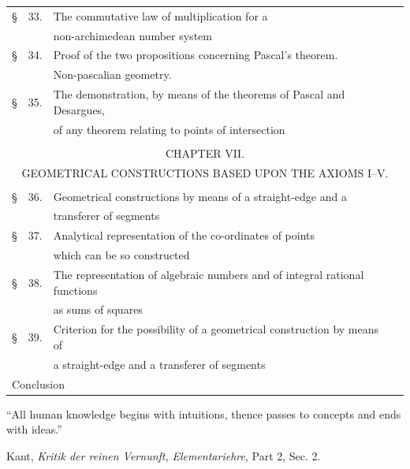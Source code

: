 \documentclass[11pt,oneside]{book}
\begin{document}
\begin{tabular}{l@{}rl@{\ }r}
\S &33. &The commutative law of multiplication for a&\\
&& non-archimedean number system~\dotfill &\pageref{p33}\\
\S &34. &Proof of the two propositions concerning Pascal's theorem.&\\
&& Non-pascalian geometry.~\dotfill &\pageref{p34}\\
\S &35. &The demonstration, by means of the theorems of Pascal and Desargues,&\\
&& of any theorem relating to points of intersection~\dotfill &\pageref{p35}\\
\multicolumn{4}{c}{}\\
\multicolumn{4}{c}{CHAPTER VII.}\\
\multicolumn{4}{c}{\small GEOMETRICAL CONSTRUCTIONS BASED UPON THE AXIOMS I--V.}\\
\multicolumn{4}{c}{}\\
\S &36. &Geometrical constructions by means of a straight-edge and a&\\
&& transferer of segments~\dotfill &\pageref{p36}\\
\S &37. &Analytical representation of the co-ordinates of points&\\
&& which can be so constructed~\dotfill &\pageref{p37}\\
\S &38. &The representation of algebraic numbers and of integral rational functions&\\
&& as sums of squares~\dotfill &\pageref{p38}\\
\S &39. &Criterion for the possibility of a geometrical construction by means of&\\
&& a straight-edge and a transferer of segments~\dotfill &\pageref{p39}\\
\multicolumn{3}{l}{Conclusion~\dotfill}&\pageref{pc}\\
\end{tabular}

\clearpage
{}
\thispagestyle{empty}
\label{folio1}
\begin{flushright}
  \parbox{3in}{\setlength{\parindent}{1em}
  ``All human knowledge begins with intuitions,
  thence passes to concepts and
  ends with ideas.''}
\end{flushright}
\begin{flushright}
  \parbox{2.5in}{\setlength{\parindent}{1em}
  Kant, \emph{Kritik der reinen Vernunft,}
  \emph{Elementariehre}, Part 2, Sec. 2.}
\end{flushright}
\end{document}
